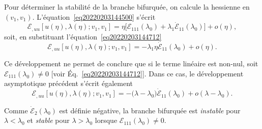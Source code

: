 \documentclass[12pt, final]{amsart}
\begin{document}
Pour déterminer la stabilité de la branche bifurquée, on calcule la hessienne
en \((v_1, v_1)\). L'équation~\eqref{eq20220203144500} s'écrit
\begin{equation}
  \mathcal E_{,uu}[u(\eta ), \lambda (\eta ); v_1, v_1]=\eta \bigl[\mathcal E_{111}(\lambda _0)+\lambda _1\dot{\mathcal E}_{11}(\lambda _0)\bigr]+o(\eta ),
\end{equation}
soit, en substituant l'équation~\eqref{eq20220203144712}
\begin{equation}
  \mathcal E_{,uu}[u(\eta ), \lambda (\eta ); v_1, v_1]=-\lambda _1\eta \dot{\mathcal E}_{11}(\lambda _0)+o(\eta ).
\end{equation}

Ce développement ne permet de conclure que si le terme linéaire est non-nul,
soit \(\mathcal E_{111}(\lambda _0)\neq0\) [voir Éq.~\eqref{eq20220203144712}]. Dans ce cas, le
développement asymptotique précédent s'écrit également
\begin{equation}
  \mathcal E_{,uu}[u(\eta ), \lambda (\eta ); v_1, v_1]=-\bigl(\lambda -\lambda _0\bigr)\dot{\mathcal E}_{11}(\lambda _0)+o(\lambda -\lambda _0).
\end{equation}

Comme \(\dot{\mathcal E}_2(\lambda _0)\) est définie négative, la branche bifurquée est
\emph{instable} pour \(\lambda <\lambda _0\) et \emph{stable} pour \(\lambda >\lambda _0\) lorsque
\(\mathcal E_{111}(\lambda _0)\neq0\).
\end{document}
